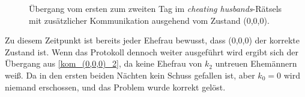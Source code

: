 \begin{figure}
	\caption{Übergang vom ersten zum zweiten Tag im \textit{cheating husbands}-Rätsels mit zusätzlicher Kommunikation ausgehend vom Zustand (0,0,0).}
	\label{kom_(0,0,0)_1}
\end{figure}

Zu diesem Zeitpunkt ist bereits jeder Ehefrau bewusst, dass (0,0,0) der korrekte Zustand ist. Wenn das Protokoll dennoch weiter ausgeführt wird ergibt sich der Übergang aus \ref{kom_(0,0,0)_2}, da keine Ehefrau von $k_2$ untreuen Ehemännern weiß.
Da in den ersten beiden Nächten kein Schuss gefallen ist, aber $k_0 = 0$ wird niemand erschossen, und das Problem wurde korrekt gelöst.

